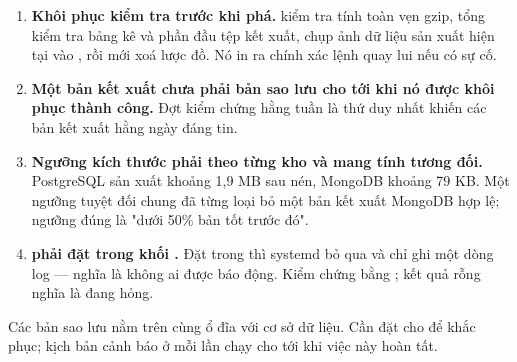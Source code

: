 \begin{enumerate}[leftmargin=1.4em]
  \item \textbf{Khôi phục kiểm tra trước khi phá.}  kiểm tra tính
  toàn vẹn gzip, tổng kiểm tra bảng kê và phần đầu tệp kết xuất, chụp ảnh dữ liệu sản xuất
  hiện tại vào , rồi mới xoá lược đồ. Nó in ra chính xác lệnh
  quay lui nếu có sự cố.
  \item \textbf{Một bản kết xuất chưa phải bản sao lưu cho tới khi nó được khôi phục
  thành công.} Đợt kiểm chứng hằng tuần là thứ duy nhất khiến các bản kết xuất hằng ngày
  đáng tin.
  \item \textbf{Ngưỡng kích thước phải theo từng kho và mang tính tương đối.} PostgreSQL
  sản xuất khoảng 1,9 MB sau nén, MongoDB khoảng 79 KB. Một ngưỡng tuyệt đối chung đã từng
  loại bỏ một bản kết xuất MongoDB hợp lệ; ngưỡng đúng là "dưới 50\% bản tốt trước đó".
  \item \textbf{ phải đặt trong khối \code{[Unit]}.} Đặt trong
  \code{[Service]} thì systemd bỏ qua và chỉ ghi một dòng log — nghĩa là không ai được
  báo động. Kiểm chứng bằng ; kết quả
  rỗng nghĩa là đang hỏng.
\end{enumerate}

\begin{luuy}
Các bản sao lưu nằm trên cùng ổ đĩa với cơ sở dữ liệu. Cần đặt
 cho  để khắc phục; kịch bản
cảnh báo ở mỗi lần chạy cho tới khi việc này hoàn tất.
\end{luuy}
